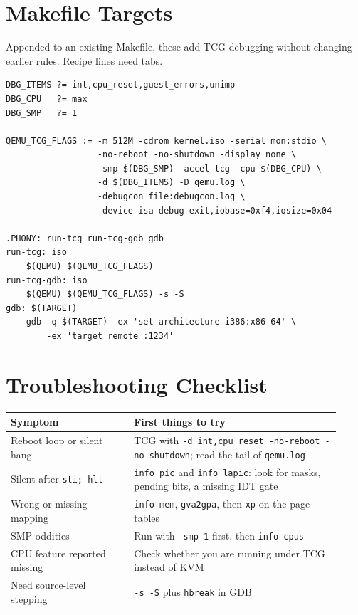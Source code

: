 \documentclass[11pt,a4paper]{article}
\newcommand{\cmd}[1]{\texttt{#1}}
\begin{document}
\section{Makefile Targets}
Appended to an existing Makefile, these add TCG debugging without changing
earlier rules. Recipe lines need tabs.
\begin{lstlisting}
DBG_ITEMS ?= int,cpu_reset,guest_errors,unimp
DBG_CPU   ?= max
DBG_SMP   ?= 1

QEMU_TCG_FLAGS := -m 512M -cdrom kernel.iso -serial mon:stdio \
                  -no-reboot -no-shutdown -display none \
                  -smp $(DBG_SMP) -accel tcg -cpu $(DBG_CPU) \
                  -d $(DBG_ITEMS) -D qemu.log \
                  -debugcon file:debugcon.log \
                  -device isa-debug-exit,iobase=0xf4,iosize=0x04

.PHONY: run-tcg run-tcg-gdb gdb
run-tcg: iso
	$(QEMU) $(QEMU_TCG_FLAGS)
run-tcg-gdb: iso
	$(QEMU) $(QEMU_TCG_FLAGS) -s -S
gdb: $(TARGET)
	gdb -q $(TARGET) -ex 'set architecture i386:x86-64' \
	    -ex 'target remote :1234'
\end{lstlisting}

\section{Troubleshooting Checklist}

\begin{center}
\small
\begin{tabular}{@{}p{0.34\linewidth}p{0.58\linewidth}@{}}
\toprule
Symptom & First things to try \\
\midrule
Reboot loop or silent hang
  & TCG with \cmd{-d int,cpu\_reset -no-reboot -no-shutdown}; read the tail of \cmd{qemu.log} \\
Silent after \cmd{sti; hlt}
  & \cmd{info pic} and \cmd{info lapic}: look for masks, pending bits, a missing IDT gate \\
Wrong or missing mapping
  & \cmd{info mem}, \cmd{gva2gpa}, then \cmd{xp} on the page tables \\
SMP oddities
  & Run with \cmd{-smp 1} first, then \cmd{info cpus} \\
CPU feature reported missing
  & Check whether you are running under TCG instead of KVM \\
Need source-level stepping
  & \cmd{-s -S} plus \cmd{hbreak} in GDB \\
\bottomrule
\end{tabular}
\end{center}
\end{document}
